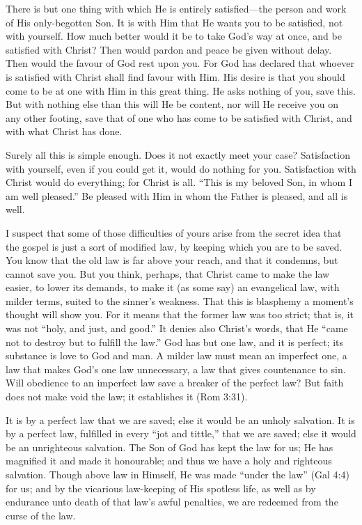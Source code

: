 \documentclass[
]{book}
\begin{document}
There is but one thing with which He is entirely satisfied---the person and work of His only-begotten Son. It is with Him that He wants you to be satisfied, not with yourself. How much better would it be to take God's way at once, and be satisfied with Christ? Then would pardon and peace be given without delay. Then would the favour of God rest upon you. For God has declared that whoever is satisfied with Christ shall find favour with Him. His desire is that you should come to be at one with Him in this great thing. He asks nothing of you, save this. But with nothing else than this will He be content, nor will He receive you on any other footing, save that of one who has come to be satisfied with Christ, and with what Christ has done.

Surely all this is simple enough. Does it not exactly meet your case? Satisfaction with yourself, even if you could get it, would do nothing for you. Satisfaction with Christ would do everything; for Christ is all. ``This is my beloved Son, in whom I am well pleased.'' Be pleased with Him in whom the Father is pleased, and all is well.

I suspect that some of those difficulties of yours arise from the secret idea that the gospel is just a sort of modified law, by keeping which you are to be saved. You know that the old law is far above your reach, and that it condemns, but cannot save you. But you think, perhaps, that Christ came to make the law easier, to lower its demands, to make it (as some say) an evangelical law, with milder terms, suited to the sinner's weakness. That this is blasphemy a moment's thought will show you. For it means that the former law was too strict; that is, it was not ``holy, and just, and good.'' It denies also Christ's words, that He ``came not to destroy but to fulfill the law.'' God has but one law, and it is perfect; its substance is love to God and man. A milder law must mean an imperfect one, a law that makes God's one law unnecessary, a law that gives countenance to sin. Will obedience to an imperfect law save a breaker of the perfect law? But faith does not make void the law; it establishes it (Rom 3:31).

It is by a perfect law that we are saved; else it would be an unholy salvation. It is by a perfect law, fulfilled in every ``jot and tittle,'' that we are saved; else it would be an unrighteous salvation. The Son of God has kept the law for us; He has magnified it and made it honourable; and thus we have a holy and righteous salvation. Though above law in Himself, He was made ``under the law'' (Gal 4:4) for us; and by the vicarious law-keeping of His spotless life, as well as by endurance unto death of that law's awful penalties, we are redeemed from the curse of the law.
\end{document}
